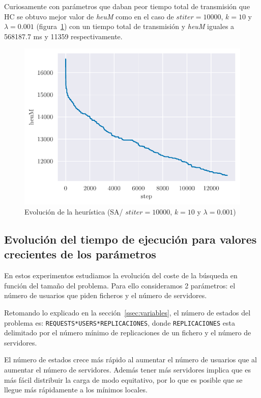Curiosamente con parámetros que daban peor tiempo total de transmisión que HC se obtuvo mejor valor de \emph{heuM} como en el caso de $stiter=10000$, $k=10$ y $\lambda=0.001$ (figura~\ref{fig:ex3_heu_steps-1000000-10000-10-0.001}) con un tiempo total de transmisión y \emph{heuM} iguales a 568187.7 ms y 11359 respectivamente. %

\begin{figure}[H]
    \centering
    \includegraphics{include/plots/ex3_heu_steps-1000000-10000-10-0.001.pdf}
    \caption{Evolución de la heurística (SA/ $stiter=10000$, $k=10$ y $\lambda=0.001$)}
    \label{fig:ex3_heu_steps-1000000-10000-10-0.001} 
\end{figure}

\pagebreak


\subsection{Evolución del tiempo de ejecución para valores crecientes de los parámetros}

En estos experimentos estudiamos la evolución del coste de la búsqueda en función del tamaño del
problema. Para ello consideramos 2 parámetros: el número de usuarios que piden ficheros y el número
de servidores.

Retomando lo explicado en la sección~\ref{ssec:variables}, el número de estados del problema es:
\texttt{REQUESTS*USERS*REPLICACIONES}, donde \texttt{REPLICACIONES} esta delimitado por
el número mínimo de replicaciones de un fichero y el número de servidores.

\begin{hyp*}
El número de estados crece más rápido al aumentar el número de usuarios que al aumentar
el número de servidores. Además tener más servidores implica que es más fácil distribuir la carga de modo
equitativo, por lo que es posible que se llegue más rápidamente a los mínimos locales.
\end{hyp*}

